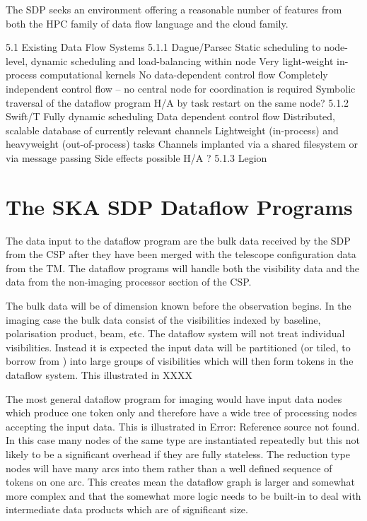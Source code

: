 \documentclass[11pt,a4paper]{article}
\begin{document}
The SDP seeks an environment offering a reasonable number of features from both the HPC family of data flow language and the cloud family.  

5.1 Existing Data Flow Systems
5.1.1 Dague/Parsec
Static scheduling to node-level, dynamic scheduling and load-balancing within node
Very light-weight in-process computational kernels
No data-dependent control flow
Completely independent control flow – no central node for coordination is required
Symbolic traversal of the dataflow program
H/A by task restart on the same node?
5.1.2 Swift/T
Fully dynamic scheduling
Data dependent control flow
Distributed, scalable database of currently relevant channels
Lightweight (in-process) and heavyweight (out-of-process) tasks
Channels implanted via a shared filesystem or via message passing
Side effects possible
H/A ?
5.1.3 Legion

\section{The SKA SDP Dataflow Programs}
\label{sec:ska-sdp-dataflow}

The data input to the dataflow program are the bulk data received by
the SDP from the CSP after they have been merged with the telescope
configuration data from the TM. The dataflow programs will handle both
the visibility data and the data from the non-imaging processor
section of the CSP.


The bulk data will be of dimension known before the observation
begins. In the imaging case the bulk data consist of the visibilities
indexed by baseline, polarisation product, beam, etc. The dataflow
system will not treat individual visibilities.  Instead it is expected
the input data will be partitioned (or tiled, to borrow from
\cite{Ragan-Kelley:2013:HLC:2499370.2462176}) into large groups of
visibilities which will then form tokens in the dataflow system.  This
illustrated in XXXX


The most general dataflow program for imaging would have input data
nodes which produce one token only and therefore have a wide tree of
processing nodes accepting the input data. This is illustrated in
Error: Reference source not found. In this case many nodes of the same
type are instantiated repeatedly but this not likely to be a
significant overhead if they are fully stateless. The reduction type
nodes will have many arcs into them rather than a well defined
sequence of tokens on one arc. This creates mean the dataflow graph is
larger and somewhat more complex and that the somewhat more logic
needs to be built-in to deal with intermediate data products which are
of significant size.
\end{document}

